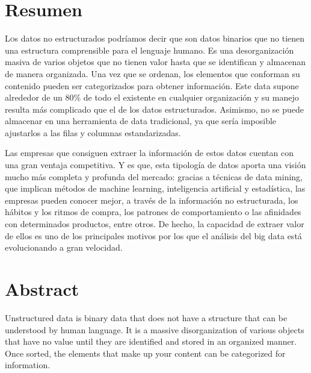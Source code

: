 \documentclass[twoside,twocolumn]{article}
\begin{document}

\section{Resumen}

\lettrine[nindent=0em,lines=3]Los datos no estructurados podríamos
 decir que son datos binarios que no tienen una estructura comprensible
  para el lenguaje humano. Es una desorganización masiva de varios objetos
   que no tienen valor hasta que se identifican y almacenan de manera organizada. 
   Una vez que se ordenan, los elementos que conforman su contenido pueden ser 
   categorizados para obtener información. 
Este data supone alrededor de un 80\% de todo el
 existente en cualquier organización y su manejo resulta más complicado que el de los datos estructurados. Asimismo, no se puede almacenar en una herramienta de data tradicional, ya que sería imposible ajustarlos a las filas y columnas estandarizadas. 

Las empresas que consiguen extraer la información de estos datos
 cuentan con una gran ventaja competitiva. Y es que, esta tipología de datos aporta una visión mucho más completa y profunda del mercado: gracias a técnicas de data mining, que implican métodos de machine learning, inteligencia artificial y estadística, las empresas pueden conocer mejor, a través de la información no estructurada, los hábitos y los ritmos de compra, los patrones de comportamiento o las afinidades con determinados productos, entre otros. De hecho, la capacidad de extraer valor de ellos es uno de los principales motivos por los 
que el análisis del big data está evolucionando a gran velocidad. 



\section{Abstract}


Unstructured data is binary data 
that does not have a structure that
 can be understood by human language.
  It is a massive disorganization of 
  various objects that have no value 
  until they are identified and stored in an organized manner.
   Once sorted, the elements that make up your content can be categorized for information. 
\end{document}
